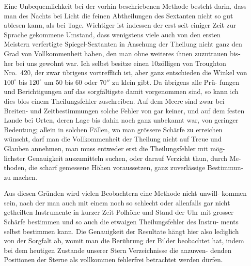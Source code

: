 \documentclass[12pt,a4paper]{article}
\begin{document}
Eine Unbequemlichkeit bei der vorhin beschriebenen Methode besteht darin,
dass man des Nachts bei Licht die feinen Abtheilungen des Sextanten nicht so
gut ablesen kann, als bei Tage. Wichtiger ist indessen der erst seit einiger Zeit
zur Sprache gekommene Umstand, dass wenigstens viele auch von den ersten
Meistern verfertigte Spiegel-Sextanten in Ansehung der Theilung nicht ganz den
Grad von Vollkommenheit haben, den man ohne weiteres ihnen zuzutrauen bis-
her bei uns gewohnt war. Ich selbst besitze einen 10zölligen von Troughton
Nro.\ 420, der zwar übrigens vortrefflich ist, aber ganz entschieden die Winkel
von $100^{\circ}$ bis $120^{\circ}$ um $50$ bis $60$ oder $70''$ zu klein gibt. Da übrigens alle Prü-
fungen und Berichtigungen auf das sorgfältigste damit vorgenommen sind, so
kann ich dies blos einem Theilungsfehler zuschreiben. Auf dem Meere sind
zwar bei Breiten- und Zeitbestimmungen solche Fehler von gar keiner, und auf
dem festen Lande bei Orten, deren Lage bis dahin noch ganz unbekannt war,
 von geringer Bedeutung; allein in solchen Fällen, wo man grössere Schärfe zu
erreichen wünscht, darf man die Vollkommenheit der Theilung nicht auf Treue
und Glauben annehmen, man muss entweder erst die Theilungsfehler mit mög-
lichster Genauigkeit auszumitteln suchen, oder darauf Verzicht thun, durch Me-
thoden, die scharf gemessene Höhen voraussetzen, ganz zuverlässige Bestimmun-
zu machen.

Aus diesen Gründen wird vielen Beobachtern eine Methode nicht unwill-
kommen sein, nach der man auch mit einem noch so schlecht oder allenfalls gar
nicht getheilten Instrumente in kurzer Zeit Polhöhe und Stand der Uhr mit
grosser Schärfe bestimmen und so auch die etwaigen Theilungsfehler des Instru-
ments selbst bestimmen kann. Die Genauigkeit der Resultate hängt hier also
lediglich von der Sorgfalt ab, womit man die Berührung der Bilder beobachtet
hat, indem bei dem heutigen Zustande unserer Stern Verzeichnisse die anzuwen-
denden Positionen der Sterne als vollkommen fehlerfrei betrachtet werden dürfen.
\end{document}
